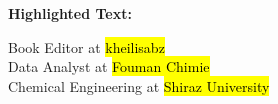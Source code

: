 \documentclass[12pt]{article}
\begin{document}
  
                    \begin{center}  
                         \textbf{Highlighted Text:}  
                    \end{center}  
                    Book Editor at \hl{kheilisabz} \\
                    Data Analyst at  \hl{Fouman Chimie}\\  
                    Chemical Engineering at  \hl{Shiraz University}  
                
\end{document}
